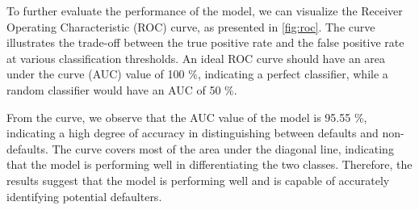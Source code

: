         To further evaluate the performance of the model, we can visualize the Receiver Operating Characteristic (ROC) curve, as presented in \autoref{fig:roc}. The curve illustrates the trade-off between the true positive rate and the false positive rate at various classification thresholds. An ideal ROC curve should have an area under the curve (AUC) value of 100 \%, indicating a perfect classifier, while a random classifier would have an AUC of 50 \%.
        
        From the curve, we observe that the AUC value of the model is 95.55 \%, indicating a high degree of accuracy in distinguishing between defaults and non-defaults. The curve covers most of the area under the diagonal line, indicating that the model is performing well in differentiating the two classes. Therefore, the results suggest that the model is performing well and is capable of accurately identifying potential defaulters.
        
